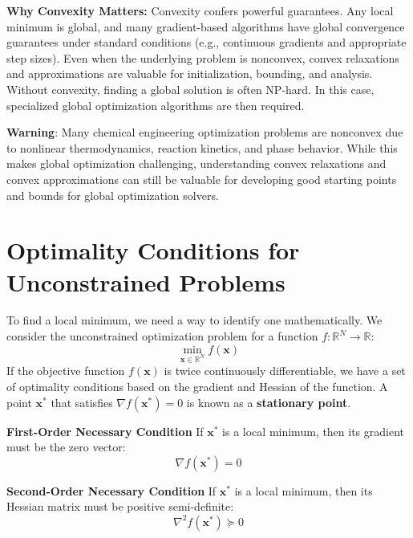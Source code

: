 \textbf{Why Convexity Matters:} Convexity confers powerful guarantees. Any local minimum is global, and many gradient-based algorithms have global convergence guarantees under standard conditions (e.g., continuous gradients and appropriate step sizes). Even when the underlying problem is nonconvex, convex relaxations and approximations are valuable for initialization, bounding, and analysis. Without convexity, finding a global solution is often NP-hard. In this case, specialized global optimization algorithms are then required.

\begin{warningBox}
    \textbf{Warning}: Many chemical engineering optimization problems are nonconvex due to nonlinear thermodynamics, reaction kinetics, and phase behavior. While this makes global optimization challenging, understanding convex relaxations and convex approximations can still be valuable for developing good starting points and bounds for global optimization solvers.
\end{warningBox}

\section{Optimality Conditions for Unconstrained Problems}
To find a local minimum, we need a way to identify one mathematically. We consider the unconstrained optimization problem for a function $f: \mathbb{R}^N \to \mathbb{R}$:
\begin{equation}
    \min_{\mathbf{x} \in \mathbb{R}^N} f(\mathbf{x})
\end{equation}
If the objective function $f(\mathbf{x})$ is twice continuously differentiable, we have a set of optimality conditions based on the gradient and Hessian of the function. A point $\mathbf{x}^*$ that satisfies $\nabla f(\mathbf{x}^*) = 0$ is known as a \textbf{stationary point}.

\begin{definitionBox}
\textbf{First-Order Necessary Condition}
If $\mathbf{x}^*$ is a local minimum, then its gradient must be the zero vector:
\begin{equation}
    \nabla f(\mathbf{x}^*) = 0
\end{equation}
\end{definitionBox}

\begin{definitionBox}
\textbf{Second-Order Necessary Condition}
If $\mathbf{x}^*$ is a local minimum, then its Hessian matrix must be positive semi-definite:
\begin{equation}
    \nabla^2 f(\mathbf{x}^*) \succeq 0
\end{equation}
\end{definitionBox}

